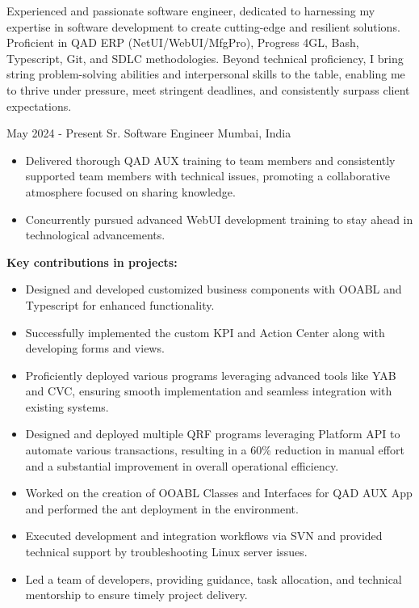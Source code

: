 \documentclass{curriculum-vitae}
\begin{document}


Experienced and passionate software engineer, dedicated to harnessing my expertise in software development to
create cutting-edge and resilient solutions. Proficient in QAD ERP (NetUI/WebUI/MfgPro), Progress 4GL,
Bash, Typescript, Git, and SDLC methodologies. Beyond technical proficiency, I bring string problem-solving
abilities and interpersonal skills to the table, enabling me to thrive under pressure, meet stringent deadlines, and
consistently surpass client expectations.


{May 2024 - Present}
{Sr. Software Engineer}
{Mumbai, India}

\begin{itemize}
   \item Delivered thorough QAD AUX training to team members and consistently
      supported team members with technical issues, promoting a collaborative
      atmosphere focused on sharing knowledge.
   \item Concurrently pursued advanced WebUI development training to stay ahead
      in technological advancements.
\end{itemize}

\textbf{Key contributions in projects:}

\begin{itemize}
   \item Designed and developed customized business components with OOABL and
      Typescript for enhanced functionality.
   \item Successfully implemented the custom KPI and Action Center along with
      developing forms and views.
   \item Proficiently deployed various programs leveraging advanced tools like
      YAB and CVC, ensuring smooth implementation and seamless integration with
      existing systems.
   \item Designed and deployed multiple QRF programs leveraging Platform API to
      automate various transactions, resulting in a 60\% reduction in manual
      effort and a substantial improvement in overall operational efficiency.
	\item Worked on the creation of OOABL Classes and Interfaces for QAD AUX App
		and performed the ant deployment in the environment.
   \item Executed development and integration workflows via SVN and provided
      technical support by troubleshooting Linux server issues.
   \item Led a team of developers, providing guidance, task allocation, and
      technical mentorship to ensure timely project delivery.
\end{itemize}
\end{document}
